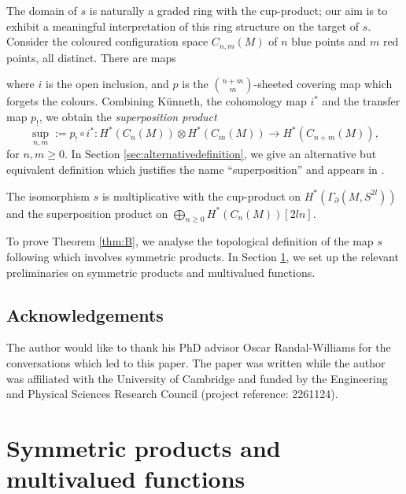 The domain of $s$ is naturally a graded ring with the cup-product; our aim is to exhibit a meaningful interpretation of this ring structure on the target of $s$. Consider the coloured configuration space $C_{n,m}(M)$ of $n$ blue points and $m$ red points, all distinct. There are maps 
\begin{center}
\end{center}
where $i$ is the open inclusion, and $p$ is the ${n+m \choose m}$-sheeted covering map which forgets the colours.
Combining K\"unneth, the cohomology map $i^*$ and the transfer map $p_!$, we obtain the \textit{superposition product} $${\sup}_{n,m}:=p_!\circ i^*:H^*(C_n(M))\otimes H^*(C_m(M))\longrightarrow H^*(C_{n+m}(M)),$$
for $n,m\ge 0$. In Section \ref{sec:alternativedefinition}, we give an alternative but equivalent definition which justifies the name ``superposition'' and appears in \cite{Moriyama,bianchi2021mapping,randalwilliams2023configuration}.

\begin{athm}\label{thm:B}
The isomorphism $s$ is multiplicative with the cup-product on ${H}^*(\Gamma_{\partial}(M,S^{2l}))$ and the superposition product on $\bigoplus_{n\ge 0}H^*(C_n(M))[2ln]$.
\end{athm}


To prove Theorem \ref{thm:B}, we analyse the topological definition of the map $s$ following \cite{Tillmanthorpe2014} which involves symmetric products. In Section \ref{sec:symmetricproductsetc}, we set up the relevant preliminaries on symmetric products and multivalued functions.

\subsection*{Acknowledgements} The author would like to thank his PhD advisor Oscar Randal-Williams for the conversations which led to this paper. The paper was written while the author was affiliated with the University of Cambridge and funded by the Engineering and Physical Sciences Research Council (project reference: 2261124).

\section{Symmetric products and multivalued functions}\label{sec:symmetricproductsetc}


